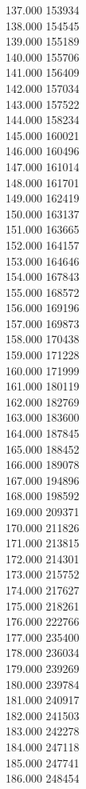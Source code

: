 { 137.000	153934 \\
 138.000	154545 \\
 139.000	155189 \\
 140.000	155706 \\
 141.000	156409 \\
 142.000	157034 \\
 143.000	157522 \\
 144.000	158234 \\
 145.000	160021 \\
 146.000	160496 \\
 147.000	161014 \\
 148.000	161701 \\
 149.000	162419 \\
 150.000	163137 \\
 151.000	163665 \\
 152.000	164157 \\
 153.000	164646 \\
 154.000	167843 \\
 155.000	168572 \\
 156.000	169196 \\
 157.000	169873 \\
 158.000	170438 \\
 159.000	171228 \\
 160.000	171999 \\
 161.000	180119 \\
 162.000	182769 \\
 163.000	183600 \\
 164.000	187845 \\
 165.000	188452 \\
 166.000	189078 \\
 167.000	194896 \\
 168.000	198592 \\
 169.000	209371 \\
 170.000	211826 \\
 171.000	213815 \\
 172.000	214301 \\
 173.000	215752 \\
 174.000	217627 \\
 175.000	218261 \\
 176.000	222766 \\
 177.000	235400 \\
 178.000	236034 \\
 179.000	239269 \\
 180.000	239784 \\
 181.000	240917 \\
 182.000	241503 \\
 183.000	242278 \\
 184.000	247118 \\
 185.000	247741 \\
 186.000	248454 \\
}

